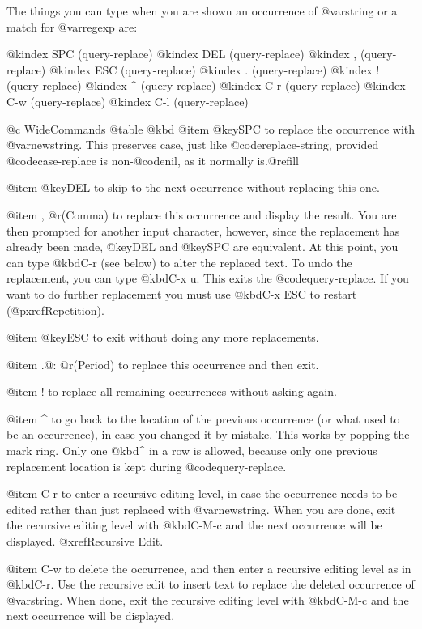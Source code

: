 {{{{{{{{{{{{{{{{  The things you can type when you are shown an occurrence of @var{string}
or a match for @var{regexp} are:

@kindex SPC (query-replace)
@kindex DEL (query-replace)
@kindex , (query-replace)
@kindex ESC (query-replace)
@kindex . (query-replace)
@kindex ! (query-replace)
@kindex ^ (query-replace)
@kindex C-r (query-replace)
@kindex C-w (query-replace)
@kindex C-l (query-replace)

@c WideCommands
@table @kbd
@item @key{SPC}
to replace the occurrence with @var{newstring}.  This preserves case, just
like @code{replace-string}, provided @code{case-replace} is non-@code{nil},
as it normally is.@refill

@item @key{DEL}
to skip to the next occurrence without replacing this one.

@item , @r{(Comma)}
to replace this occurrence and display the result.  You are then
prompted for another input character, however, since the replacement has
already been made, @key{DEL} and @key{SPC} are equivalent.  At this
point, you can type @kbd{C-r} (see below) to alter the replaced text.  To
undo the replacement, you can type @kbd{C-x u}. 
This exits the @code{query-replace}.  If you want to do further
replacement you must use @kbd{C-x ESC} to restart (@pxref{Repetition}).

@item @key{ESC}
to exit without doing any more replacements.

@item .@: @r{(Period)}
to replace this occurrence and then exit.

@item !
to replace all remaining occurrences without asking again.

@item ^
to go back to the location of the previous occurrence (or what used to
be an occurrence), in case you changed it by mistake.  This works by
popping the mark ring.  Only one @kbd{^} in a row is allowed, because
only one previous replacement location is kept during @code{query-replace}.

@item C-r
to enter a recursive editing level, in case the occurrence needs to be
edited rather than just replaced with @var{newstring}.  When you are
done, exit the recursive editing level with @kbd{C-M-c} and the next
occurrence will be displayed.  @xref{Recursive Edit}.

@item C-w
to delete the occurrence, and then enter a recursive editing level as
in @kbd{C-r}.  Use the recursive edit to insert text to replace the
deleted occurrence of @var{string}.  When done, exit the recursive
editing level with @kbd{C-M-c} and the next occurrence will be
displayed.

}}}}}}}}}}}}}}}}
